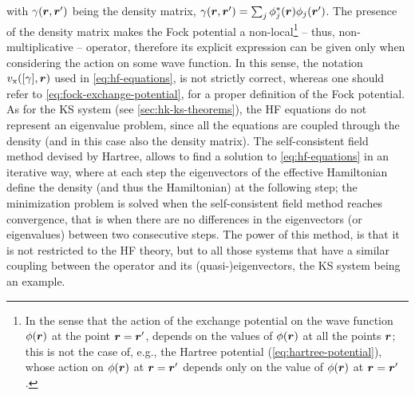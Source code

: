 with $\gamma({\bm r},{\bm r}')$ being the density matrix, $\gamma({\bm r},{\bm r}') = \sum_j \phi_j^*({\bm r}) \phi_j({\bm r}')$. The presence of the density matrix makes the Fock potential a non-local\footnote{In the sense that the action of the exchange potential on the wave function $\phi({\bm r})$ at the point ${\bm r}={\bm r}'$, depends on the values of $\phi({\bm r})$ at all the points ${\bm r}$; this is not the case of, e.g., the Hartree potential (\cref{eq:hartree-potential}), whose action on $\phi({\bm r})$ at ${\bm r}={\bm r}'$ depends only on the value of $\phi({\bm r})$ at ${\bm r}={\bm r}'$.} -- thus, non-multiplicative -- operator, therefore its explicit expression can be given only when considering the action on some wave function. In this sense, the notation $v_{\rm x}([\gamma],{\bm r})$ used in \cref{eq:hf-equations}, is not strictly correct, whereas one should refer to \cref{eq:fock-exchange-potential}, for a proper definition of the Fock potential. As for the KS system (see \cref{sec:hk-ks-theorems}), the HF equations do not represent an eigenvalue problem, since all the equations are coupled through the density (and in this case also the density matrix). The self-consistent field method devised by Hartree, allows to find a solution to \cref{eq:hf-equations} in an iterative way, where at each step the eigenvectors of the effective Hamiltonian define the density (and thus the Hamiltonian) at the following step; the minimization problem is solved when the self-consistent field method reaches convergence, that is when there are no differences in the eigenvectors (or eigenvalues) between two consecutive steps. The power of this method, is that it is not restricted to the HF theory, but to all those systems that have a similar coupling between the operator and its (quasi-)eigenvectors, the KS system being an example.


